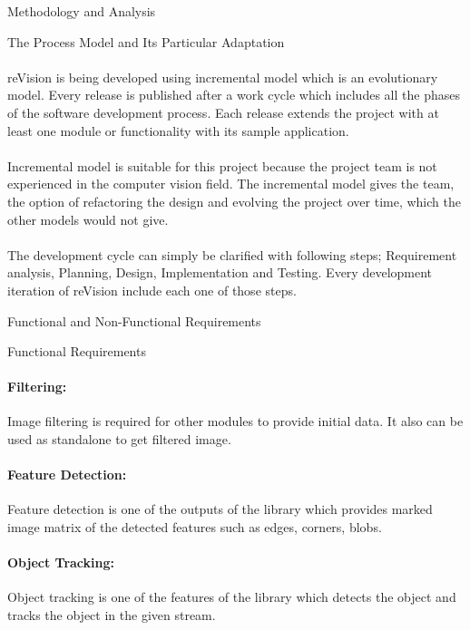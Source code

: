 \documentclass[12pt, a4paper]{article} \pagenumbering{gobble}
\begin{document}
\begin{section}{Methodology and Analysis}
\begin{subsection}{The Process Model and Its Particular Adaptation}
\paragraph{}{reVision is being developed using incremental model which is an evolutionary model. Every release is published after a work cycle which includes all the phases of the software development process. Each release extends the project with at least one module or functionality with its sample application.}
\paragraph{}{Incremental model is suitable for this project because the project team is not experienced in the computer vision field. The incremental model gives the team, the option of refactoring the design and evolving the project over time, which the other models would not give.}
\paragraph{}{The development cycle can simply be clarified with following steps; Requirement analysis, Planning, Design, Implementation and Testing. Every development iteration of reVision include each one of those steps.}
  \end{subsection}
  \newpage
  \begin{subsection}{Functional and Non-Functional Requirements}
    \begin{subsubsection}{Functional Requirements}
      \paragraph{Filtering:}{
      Image filtering is required for other modules to provide initial data. It also can be used as standalone to get filtered image.
      }
      \paragraph{Feature Detection:}{
      Feature detection is one of the outputs of the library which provides marked image matrix of the detected features such as edges, corners, blobs.
      }
      \paragraph{Object Tracking:}{
      Object tracking is one of the features of the library which detects the object and tracks the object in the given stream.
      }
    \end{subsubsection}


\end{subsection}
\end{section}
\end{document}
